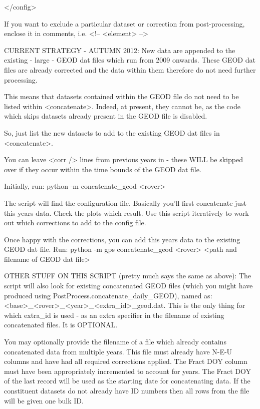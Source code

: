\documentclass[11pt]{article} %
\begin{document}
</config>	

If you want to exclude a particular dataset or correction from post-processing, enclose it in comments, i.e. <!-- <element> -->

CURRENT STRATEGY - AUTUMN 2012:
New data are appended to the existing - large - GEOD dat files which run from 2009 onwards. These GEOD dat files are already corrected and the data within them therefore do not need further processing.

This means that datasets contained within the GEOD file do not need to be listed within <concatenate>. Indeed, at present, they cannot be, as the code which skips datasets already present in the GEOD file is disabled.

So, just list the new datasets to add to the existing GEOD dat files in <concatenate>.

You can leave <corr /> lines from previous years in - these WILL be skipped over if they occur within the time bounds of the GEOD dat file. 

Initially, run:
		python -m concatenate_geod <rover>
		
The script will find the configuration file. Basically you'll first concatenate just this years data. Check the plots which result. Use this script iteratively to work out which corrections to add to the config file.

Once happy with the corrections, you can add this years data to the existing GEOD dat file. Run:
  python -m gps concatenate_geod <rover> <path and filename of GEOD dat file>
  
 
OTHER STUFF ON THIS SCRIPT (pretty much says the same as above):
The script will also look for existing concatenated GEOD files (which you might have produced using PostProcess.concatenate_daily_GEOD), named as: <base>_<rover>_<year>_<extra_id>_geod.dat. This is the only thing for which extra_id is used - as an extra specifier in the filename of existing concatenated files. It is OPTIONAL.
                              
You may optionally provide the filename of a file which already contains concatenated data from multiple years. This file must already have N-E-U columns and have had all required corrections applied. The Fract DOY column must have been appropriately incremented to account for years. The Fract DOY of the last record will be used as the starting date for concatenating data. If the constituent datasets do not already have ID numbers then all rows from the file will be given one bulk ID.
\end{document}
